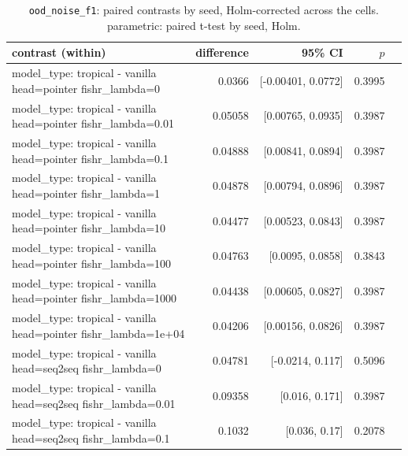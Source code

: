\documentclass[10pt]{article}
\makeatletter
\newcommand{\stackcell}[1]{\begin{tabular}[t]{@{}l@{}}#1\end{tabular}}
\makeatother
\begin{document}
{\small
\begin{longtable}{lrrrl}
\caption{\texttt{ood\_noise\_f1}: paired contrasts by seed, Holm-corrected across the cells. parametric: paired t-test by seed, Holm.}\label{tab:paired-ood_noise_f1}\\
\toprule
contrast (within) & difference & 95\% CI & $p$ & \\
\midrule
\endhead
\stackcell{model\_type: tropical - vanilla\\\footnotesize head=pointer fishr\_lambda=0 } & 0.0366 & [-0.00401, 0.0772] & 0.3995 & \\
\stackcell{model\_type: tropical - vanilla\\\footnotesize head=pointer fishr\_lambda=0.01 } & 0.05058 & [0.00765, 0.0935] & 0.3987 & \\
\stackcell{model\_type: tropical - vanilla\\\footnotesize head=pointer fishr\_lambda=0.1 } & 0.04888 & [0.00841, 0.0894] & 0.3987 & \\
\stackcell{model\_type: tropical - vanilla\\\footnotesize head=pointer fishr\_lambda=1 } & 0.04878 & [0.00794, 0.0896] & 0.3987 & \\
\stackcell{model\_type: tropical - vanilla\\\footnotesize head=pointer fishr\_lambda=10 } & 0.04477 & [0.00523, 0.0843] & 0.3987 & \\
\stackcell{model\_type: tropical - vanilla\\\footnotesize head=pointer fishr\_lambda=100 } & 0.04763 & [0.0095, 0.0858] & 0.3843 & \\
\stackcell{model\_type: tropical - vanilla\\\footnotesize head=pointer fishr\_lambda=1000 } & 0.04438 & [0.00605, 0.0827] & 0.3987 & \\
\stackcell{model\_type: tropical - vanilla\\\footnotesize head=pointer fishr\_lambda=1e+04 } & 0.04206 & [0.00156, 0.0826] & 0.3987 & \\
\stackcell{model\_type: tropical - vanilla\\\footnotesize head=seq2seq fishr\_lambda=0 } & 0.04781 & [-0.0214, 0.117] & 0.5096 & \\
\stackcell{model\_type: tropical - vanilla\\\footnotesize head=seq2seq fishr\_lambda=0.01 } & 0.09358 & [0.016, 0.171] & 0.3987 & \\
\stackcell{model\_type: tropical - vanilla\\\footnotesize head=seq2seq fishr\_lambda=0.1 } & 0.1032 & [0.036, 0.17] & 0.2078 & \\

\end{longtable}}
\end{document}
